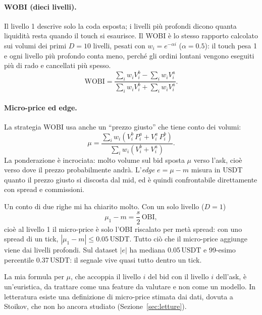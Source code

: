 \documentclass[a4paper,11pt]{article}
\newcommand{\OBI}{\mathrm{OBI}}
\newcommand{\WOBI}{\mathrm{WOBI}}
\newcommand{\usdt}{\ensuremath{\,\mathrm{USDT}}}
\begin{document}
\paragraph{WOBI (dieci livelli).} Il livello 1 descrive solo la coda esposta; i livelli più
profondi dicono quanta liquidità resta quando il touch si esaurisce. Il WOBI è lo stesso
rapporto calcolato sui volumi dei primi $D=10$ livelli, pesati con $w_i = e^{-\alpha i}$
($\alpha = 0.5$): il touch pesa 1 e ogni livello più profondo conta meno, perché gli ordini
lontani vengono eseguiti più di rado e cancellati più spesso.
\begin{equation}
  \WOBI = \frac{\sum_i w_i V^b_i - \sum_i w_i V^a_i}{\sum_i w_i V^b_i + \sum_i w_i V^a_i}.
  \label{eq:wobi}
\end{equation}

\paragraph{Micro-price ed edge.} La strategia WOBI usa anche un ``prezzo giusto'' che tiene
conto dei volumi:
\begin{equation}
  \mu = \frac{\sum_i w_i \left( V^b_i\, P^a_i + V^a_i\, P^b_i \right)}
             {\sum_i w_i \left( V^b_i + V^a_i \right)} .
  \label{eq:micro}
\end{equation}
La ponderazione è incrociata: molto volume sul bid sposta $\mu$ verso l'ask, cioè verso dove
il prezzo probabilmente andrà. L'\emph{edge} $e = \mu - m$ misura in USDT quanto il prezzo
giusto si discosta dal mid, ed è quindi confrontabile direttamente con spread e commissioni.

Un conto di due righe mi ha chiarito molto. Con un solo livello ($D=1$)
\begin{equation}
  \mu_1 - m = \frac{s}{2}\,\OBI ,
  \label{eq:micro1}
\end{equation}
cioè al livello 1 il micro-price è solo l'OBI riscalato per metà spread: con uno spread di un
tick, $|\mu_1 - m| \le 0.05\usdt{}$. Tutto ciò che il micro-price aggiunge viene dai livelli
profondi. Sul dataset $|e|$ ha mediana 0.05\usdt{} e 99-esimo percentile 0.37\usdt{}: il
segnale vive quasi tutto dentro un tick.

La mia formula per $\mu$, che accoppia il livello $i$ del bid con il livello $i$ dell'ask, è
un'euristica, da trattare come una feature da valutare e non come un modello. In letteratura
esiste una definizione di micro-price stimata dai dati, dovuta a Stoikov, che non ho ancora
studiato (Sezione~\ref{sec:letture}).
\end{document}
